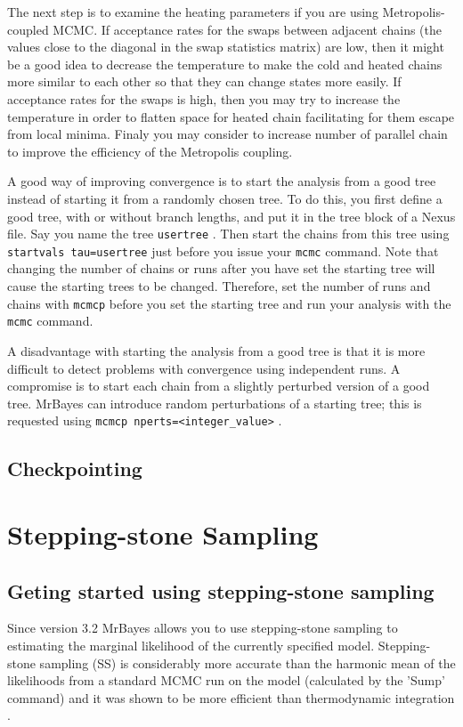\documentclass[12pt]{book}
\newcommand{\ttt}[1]{\texttt{#1} }
\begin{document}
The next step is to examine the heating parameters if you are using Metropolis-coupled MCMC. If
acceptance rates for the swaps between adjacent chains (the values close to the diagonal in the
swap statistics matrix) are low, then it might be a good idea to decrease the temperature to make
the cold and heated chains more similar to each other so that they can change states more easily.
If acceptance rates for the swaps is high, then you may try to increase the temperature in order to
flatten space for heated chain facilitating for them escape from local minima. Finaly you may
consider to increase number of parallel chain to improve the efficiency of the Metropolis coupling.

A good way of improving convergence is to start the analysis from a good tree instead of starting
it from a randomly chosen tree. To do this, you first define a good tree, with or without branch
lengths, and put it in the tree block of a Nexus file. Say you name the tree \ttt{usertree}. Then
start the chains from this tree using \ttt{startvals tau=usertree} just before you issue your
\ttt{mcmc} command. Note that changing the number of chains or runs after you have set the starting
tree will cause the starting trees to be changed. Therefore, set the number of runs and chains with
\ttt{mcmcp} before you set the starting tree and run your analysis with the \ttt{mcmc} command.

A disadvantage with starting the analysis from a good tree is that it is more difficult to detect
problems with convergence using independent runs. A compromise is to start each chain from a
slightly perturbed version of a good tree. MrBayes can introduce random perturbations of a starting
tree; this is requested using \ttt{mcmcp nperts=<integer\_value>}.

\subsection{Checkpointing}


\section{Stepping-stone Sampling}


\subsection{Geting started using stepping-stone sampling}
Since version 3.2 MrBayes allows you to use stepping-stone sampling \citep{xie11} to estimating the
marginal likelihood of the currently specified model. Stepping-stone sampling (SS) is considerably
more accurate than the harmonic mean of the likelihoods from a standard MCMC run on the model
(calculated by the 'Sump' command) and it was shown to be more efficient than thermodynamic
integration \citep{xie11}. 
\end{document}
